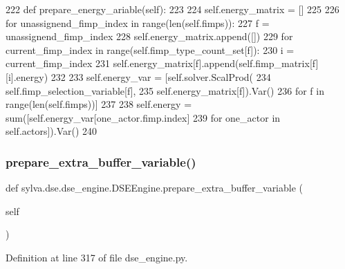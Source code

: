 \begin{DoxyCode}
222     \textcolor{keyword}{def }prepare\_energy\_ariable(self):
223 
224         self.energy\_matrix = []
225 
226         \textcolor{keywordflow}{for} unassignend\_fimp\_index \textcolor{keywordflow}{in} range(len(self.fimps)):
227             f = unassignend\_fimp\_index
228             self.energy\_matrix.append([])
229             \textcolor{keywordflow}{for} current\_fimp\_index \textcolor{keywordflow}{in} range(self.fimp\_type\_count\_set[f]):
230                 i = current\_fimp\_index
231                 self.energy\_matrix[f].append(self.fimp\_matrix[f][i].energy)
232 
233         self.energy\_var = [self.solver.ScalProd(
234             self.fimp\_selection\_variable[f],
235             self.energy\_matrix[f]).Var()
236             \textcolor{keywordflow}{for} f \textcolor{keywordflow}{in} range(len(self.fimps))]
237 
238         self.energy = sum([self.energy\_var[one\_actor.fimp.index]
239                            \textcolor{keywordflow}{for} one\_actor \textcolor{keywordflow}{in} self.actors]).Var()
240 
\end{DoxyCode}
\mbox{\label{classsylva_1_1dse_1_1dse__engine_1_1_d_s_e_engine_ab24aae396cd670d90d55b6a6fee75a08}} 
\subsubsection{\texorpdfstring{prepare\+\_\+extra\+\_\+buffer\+\_\+variable()}{prepare\_extra\_buffer\_variable()}}
{\footnotesize\ttfamily def sylva.\+dse.\+dse\+\_\+engine.\+D\+S\+E\+Engine.\+prepare\+\_\+extra\+\_\+buffer\+\_\+variable (\begin{DoxyParamCaption}\item[{}]{self }\end{DoxyParamCaption})}



Definition at line 317 of file dse\+\_\+engine.\+py.


